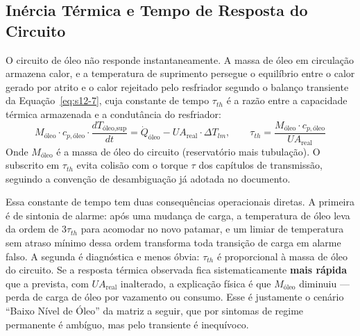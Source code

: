 \documentclass[12pt,a4paper]{article}
\numberwithin{equation}{section}
\numberwithin{table}{section}
\numberwithin{figure}{section}
\begin{document}
	\subsection{\textbf{Inércia Térmica e Tempo de Resposta do Circuito}}
	O circuito de óleo não responde instantaneamente. A massa de óleo em circulação armazena calor, e a temperatura de suprimento persegue o equilíbrio entre o calor gerado por atrito e o calor rejeitado pelo resfriador segundo o balanço transiente da Equação~\eqref{eq:s12-7}, cuja constante de tempo $\tau_{th}$ é a razão entre a capacidade térmica armazenada e a condutância do resfriador:
	\begin{equation}\label{eq:s12-7}
	M_{\text{óleo}} \cdot c_{p,\text{óleo}} \cdot \frac{dT_{\text{óleo,sup}}}{dt} = \dot{Q}_{\text{óleo}} - UA_{\text{real}} \cdot \Delta T_{lm}, \qquad \tau_{th} = \frac{M_{\text{óleo}} \cdot c_{p,\text{óleo}}}{UA_{\text{real}}}
	\end{equation}
	Onde $M_{\text{óleo}}$ é a massa de óleo do circuito (reservatório mais tubulação). O subscrito em $\tau_{th}$ evita colisão com o torque $\tau$ dos capítulos de transmissão, seguindo a convenção de desambiguação já adotada no documento.

	Essa constante de tempo tem duas consequências operacionais diretas. A primeira é de sintonia de alarme: após uma mudança de carga, a temperatura de óleo leva da ordem de $3\tau_{th}$ para acomodar no novo patamar, e um limiar de temperatura sem atraso mínimo dessa ordem transforma toda transição de carga em alarme falso. A segunda é diagnóstica e menos óbvia: $\tau_{th}$ é proporcional à massa de óleo do circuito. Se a resposta térmica observada fica sistematicamente \textbf{mais rápida} que a prevista, com $UA_{\text{real}}$ inalterado, a explicação física é que $M_{\text{óleo}}$ diminuiu — perda de carga de óleo por vazamento ou consumo. Esse é justamente o cenário ``Baixo Nível de Óleo'' da matriz a seguir, que por sintomas de regime permanente é ambíguo, mas pelo transiente é inequívoco.
\end{document}
